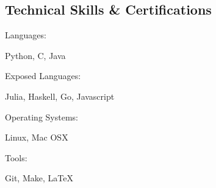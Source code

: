 \documentclass[a4paper,margin,line]{resume}
\begin{document}
\begin{resume}
\section{\mysidestyle Technical Skills \& Certifications}
	\begin{compactdesc}
		\item[Languages: ] \begin{asparablank} { \small
			\item Python, C, Java
		} \end{asparablank}
        \item[Exposed Languages: ] \begin{asparablank}{ \small
            \item Julia, Haskell, Go, Javascript
        } \end{asparablank}
		\item[Operating Systems: ] \begin{asparablank} { \small
            \item Linux, Mac OSX
		} \end{asparablank}
		\item[Tools: ] \begin{asparablank} { \small
            \item Git, Make, \LaTeX
		} \end{asparablank}
	\end{compactdesc}


\end{resume}
\end{document}
